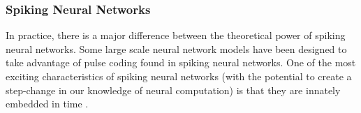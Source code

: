 \subsubsection{Spiking Neural Networks}
In practice, there is a major difference between the theoretical power of spiking neural networks. Some large scale neural network models have been designed to take advantage of pulse coding found in spiking neural networks. One of the most exciting characteristics of spiking neural networks (with the potential to create a step-change in our knowledge of neural computation) is that they are innately embedded in time \cite{Maass1996}.

